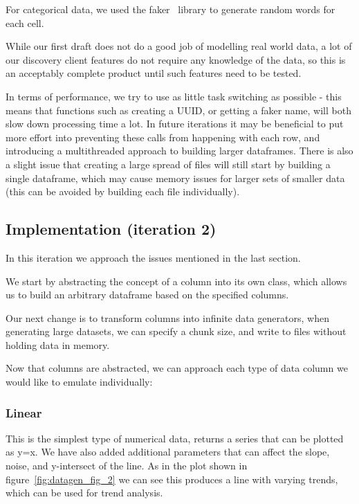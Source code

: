 For categorical data, we used the faker~\cite{PythonFaker} library to generate random words for each cell.

While our first draft does not do a good job of modelling real world data, a lot of our discovery client features do not
require any knowledge of the data, so this is an acceptably complete product until such features need to be tested.

In terms of performance, we try to use as little task switching as possible - this means that functions such as creating
a UUID, or getting a faker name, will both slow down processing time a lot.
In future iterations it may be beneficial to put more effort into preventing these calls from happening with each row,
and introducing a multithreaded approach to building larger dataframes.
There is also a slight issue that creating a large spread of files will still start by building a single dataframe, which
may cause memory issues for larger sets of smaller data (this can be avoided by building each file individually).

\subsection{Implementation (iteration 2)}\label{subsec:implementation-(iteration-2)}

In this iteration we approach the issues mentioned in the last section.

We start by abstracting the concept of a column into its own class, which allows us to build an arbitrary dataframe
based on the specified columns.

Our next change is to transform columns into infinite data generators, when generating large datasets, we can specify
a chunk size, and write to files without holding data in memory.

Now that columns are abstracted, we can approach each type of data column we would like to emulate individually:

\subsubsection{Linear}

This is the simplest type of numerical data, returns a series that can be plotted as y=x.
We have also added additional parameters that can affect the slope, noise, and y-intersect of the line.
As in the plot shown in figure~\ref{fig:datagen_fig_2} we can see this produces a line with varying trends, which can be used
for trend analysis.

